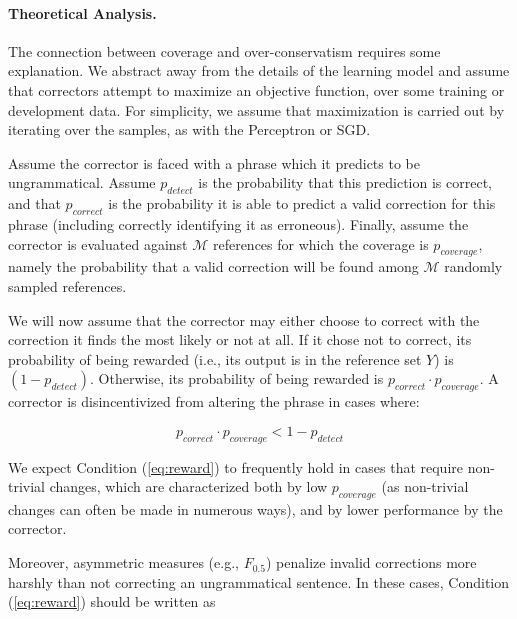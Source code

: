 \documentclass[letterpaper, 11pt]{article}
\newenvironment{myequation}{
  \vspace{-1em}
 \begin{equation}
}{
 \end{equation}
 \vspace{-1.2em}
}
\begin{document}
\paragraph{Theoretical Analysis.}
The connection between coverage and over-conservatism requires some explanation.
We abstract away from the details of the learning model and assume that correctors attempt to maximize an objective function, 
over some training or development data. For simplicity, we assume that maximization is carried out by iterating 
over the samples, as with the Perceptron or SGD.

Assume the corrector is faced with a phrase which it predicts to be ungrammatical. 
Assume $p_{detect}$ is the probability that this prediction is correct, and that
$p_{correct}$ is the probability it is able to predict
a valid correction for this phrase (including correctly identifying it as erroneous).
Finally, assume the corrector is evaluated
against $\mathcal{M}$ references for which the coverage is $p_{coverage}$,
namely the probability that
a valid correction will be found among $\mathcal{M}$ randomly sampled references.

We will now assume that the corrector may either choose to correct with the correction it finds 
the most likely or not at all. If it chose not to correct, its probability of being rewarded 
(i.e., its output is in the reference set $Y$) is $(1-p_{detect})$. Otherwise, its probability
of being rewarded is $p_{correct} \cdot p_{coverage}$.
A corrector is disincentivized from altering the phrase in cases where:

\vspace{.1cm}
\begin{small}
\begin{myequation}
  \label{eq:reward}
  p_{correct} \cdot p_{coverage} < 1-p_{detect} 
\end{myequation}
\vspace{-.1cm}
\end{small}


We expect Condition (\ref{eq:reward}) to frequently hold in cases that
require non-trivial changes, which are characterized both by low $p_{coverage}$ (as non-trivial
changes can often be made in numerous ways), and by lower performance by the corrector.

Moreover, asymmetric measures (e.g., $F_{0.5}$) penalize invalid corrections more
harshly than not correcting an ungrammatical sentence.
In these cases, Condition (\ref{eq:reward}) should be written as
\end{document}
